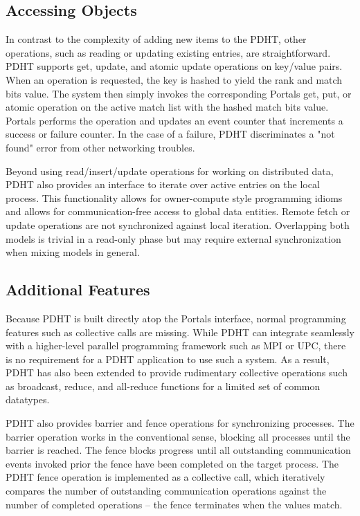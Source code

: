 \subsection{Accessing Objects}

In contrast to the complexity of adding new items to the PDHT, other
operations, such as reading or updating existing entries, are straightforward.
PDHT supports get, update, and atomic update operations on key/value pairs.
When an operation is requested, the key is hashed to yield the rank and match
bits value. The system then simply invokes the corresponding Portals get, put, or
atomic operation on the active match list with the hashed match bits value.
Portals performs the operation and updates an event counter that increments a
success or failure counter. In the case of a failure, PDHT discriminates a "not
found" error from other networking troubles.

Beyond using read/insert/update operations for working on distributed data,
PDHT also provides an interface to iterate over active entries on the local
process. This functionality allows for owner-compute style programming idioms
and allows for communication-free access to global data entities. Remote fetch
or update operations are not synchronized against local iteration. Overlapping
both models is trivial in a read-only phase but may require external
synchronization when mixing models in general.


\subsection{Additional Features}

Because PDHT is built directly atop the Portals interface, normal programming
features such as collective calls are missing. While PDHT can integrate
seamlessly with a higher-level parallel programming framework such as MPI or
UPC, there is no requirement for a PDHT application to use such a system. As a
result, PDHT has also been extended to provide rudimentary collective
operations such as broadcast, reduce, and all-reduce functions for a limited
set of common datatypes.

PDHT also provides barrier and fence operations for synchronizing processes.
The barrier operation works in the conventional sense, blocking all processes
until the barrier is reached. The fence blocks progress until all outstanding
communication events invoked prior the fence have been completed on the target
process. The PDHT fence operation is implemented as a collective call, which
iteratively compares the number of outstanding communication operations against
the number of completed operations -- the fence terminates when the values
match. 

